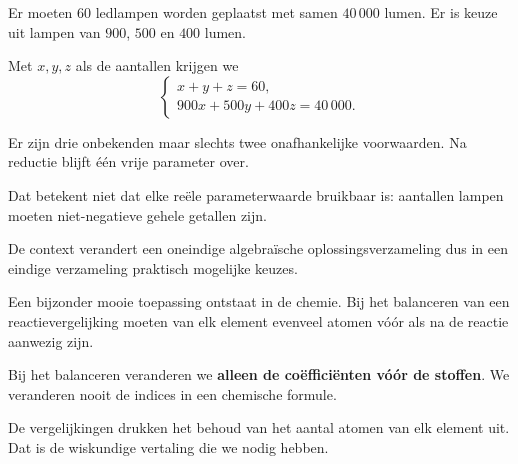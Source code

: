 \documentclass{ximera}
\begin{document}
\begin{voorbeeld}

Er moeten \(60\) ledlampen worden geplaatst met samen \(40\,000\) lumen.
Er is keuze uit lampen van \(900\), \(500\) en \(400\) lumen.

Met \(x,y,z\) als de aantallen krijgen we
\[
\begin{cases}
x+y+z=60,\\
900x+500y+400z=40\,000.
\end{cases}
\]

Er zijn drie onbekenden maar slechts twee onafhankelijke voorwaarden.
Na reductie blijft één vrije parameter over.

Dat betekent niet dat elke reële parameterwaarde bruikbaar is:
aantallen lampen moeten niet-negatieve gehele getallen zijn.

De context verandert een oneindige algebraïsche oplossingsverzameling dus
in een eindige verzameling praktisch mogelijke keuzes.
\end{voorbeeld}




Een bijzonder mooie toepassing ontstaat in de chemie.
Bij het balanceren van een reactievergelijking moeten van elk element
evenveel atomen vóór als na de reactie aanwezig zijn.

\begin{opmerking}
Bij het balanceren veranderen we \textbf{alleen de coëfficiënten vóór de
stoffen}. We veranderen nooit de indices in een chemische formule.

De vergelijkingen drukken het behoud van het aantal atomen van elk element
uit. Dat is de wiskundige vertaling die we nodig hebben.
\end{opmerking}
\end{document}
